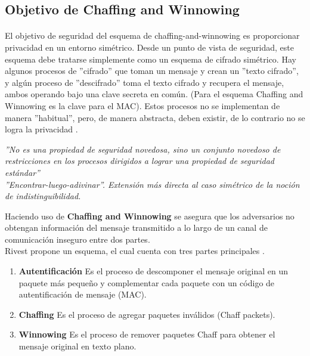 \documentclass[12pt, a4paper, titlepage]{report}
\begin{document}
		\subsection{Objetivo de Chaffing and Winnowing}
		
		\paragraph{}
		El objetivo de seguridad del esquema de chaffing-and-winnowing es proporcionar privacidad en un entorno simétrico. 
        Desde un punto de vista de seguridad, este esquema debe tratarse simplemente como un esquema de cifrado simétrico. Hay algunos procesos de ''cifrado'' que toman un mensaje y crean un ''texto cifrado'', y algún proceso de ''descifrado'' toma el texto cifrado y recupera el mensaje, ambos operando bajo una clave secreta en com\'un. (Para el esquema Chaffing and Winnowing es la clave para el MAC). Estos procesos no se implementan de manera ''habitual'', pero, de manera abstracta, deben existir, de lo contrario no se logra la privacidad  \cite{refRivestSeguridad} \cite{refEncontrarLuegoAdivinar}.  
        \begin{center}
            \textit{''No es una propiedad de seguridad novedosa, sino un conjunto novedoso de restricciones en los procesos dirigidos a lograr una propiedad de seguridad estándar''\\
            ''Encontrar-luego-adivinar''. Extensión más directa al caso simétrico de la noción de indistinguibilidad.}
        \end{center}
		
		Haciendo uso de \textbf{Chaffing and Winnowing} se asegura que los adversarios no obtengan información del mensaje transmitido a lo largo de un canal de comunicación inseguro entre dos partes. \\
		Rivest propone un esquema, el cual cuenta con tres partes principales \cite{refCryptohraphyWithoutEncryption}.
		\begin{enumerate}
		    \item \textbf{Autentificación} Es el proceso de descomponer el mensaje original en un paquete más pequeño y complementar cada paquete con un código de autentificación de mensaje (MAC).
		    \item \textbf{Chaffing} Es el proceso de agregar paquetes inválidos (Chaff packets).
		    \item \textbf{Winnowing} Es el proceso de remover paquetes Chaff para obtener el mensaje original en texto plano.
		\end{enumerate}
		
\end{document}
